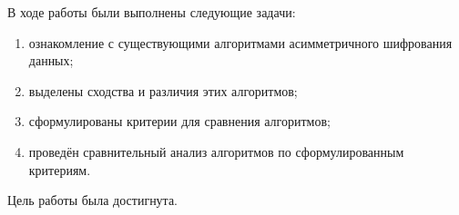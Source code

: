 
В ходе работы были выполнены следующие задачи:

\begin{enumerate}
	\item ознакомление с существующими алгоритмами асимметричного шифрования данных;
	\item выделены сходства и различия этих алгоритмов;
	\item сформулированы критерии для сравнения алгоритмов;
	\item проведён сравнительный анализ алгоритмов по сформулированным критериям.
\end{enumerate}
Цель работы была достигнута.